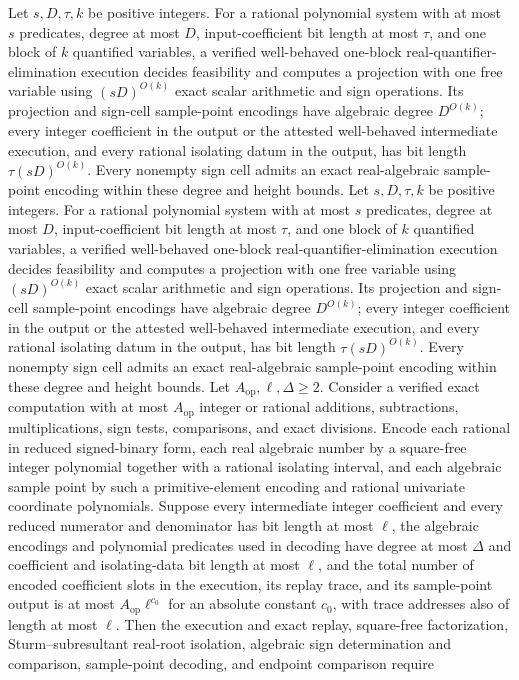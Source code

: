 Let \(s,D,\tau,k\) be positive integers.  For a rational polynomial system with at most \(s\) predicates, degree at most \(D\), input-coefficient bit length at most \(\tau\), and one block of \(k\) quantified variables, a verified well-behaved one-block real-quantifier-elimination execution decides feasibility and computes a projection with one free variable using \((sD)^{O(k)}\) exact scalar arithmetic and sign operations.  Its projection and sign-cell sample-point encodings have algebraic degree \(D^{O(k)}\); every integer coefficient in the output or the attested well-behaved intermediate execution, and every rational isolating datum in the output, has bit length \(\tau(sD)^{O(k)}\).  Every nonempty sign cell admits an exact real-algebraic sample-point encoding within these degree and height bounds.
Let \(s,D,\tau,k\) be positive integers.  For a rational polynomial system with at most \(s\) predicates, degree at most \(D\), input-coefficient bit length at most \(\tau\), and one block of \(k\) quantified variables, a verified well-behaved one-block real-quantifier-elimination execution decides feasibility and computes a projection with one free variable using \((sD)^{O(k)}\) exact scalar arithmetic and sign operations.  Its projection and sign-cell sample-point encodings have algebraic degree \(D^{O(k)}\); every integer coefficient in the output or the attested well-behaved intermediate execution, and every rational isolating datum in the output, has bit length \(\tau(sD)^{O(k)}\).  Every nonempty sign cell admits an exact real-algebraic sample-point encoding within these degree and height bounds.
Let \(A_{\mathrm{op}},\ell,\Delta\ge 2\).  Consider a verified exact computation with at most \(A_{\mathrm{op}}\) integer or rational additions, subtractions, multiplications, sign tests, comparisons, and exact divisions.  Encode each rational in reduced signed-binary form, each real algebraic number by a square-free integer polynomial together with a rational isolating interval, and each algebraic sample point by such a primitive-element encoding and rational univariate coordinate polynomials.  Suppose every intermediate integer coefficient and every reduced numerator and denominator has bit length at most \(\ell\), the algebraic encodings and polynomial predicates used in decoding have degree at most \(\Delta\) and coefficient and isolating-data bit length at most \(\ell\), and the total number of encoded coefficient slots in the execution, its replay trace, and its sample-point output is at most \(A_{\mathrm{op}}\ell^{c_0}\) for an absolute constant \(c_0\), with trace addresses also of length at most \(\ell\).  Then the execution and exact replay, square-free factorization, Sturm--subresultant real-root isolation, algebraic sign determination and comparison, sample-point decoding, and endpoint comparison require
